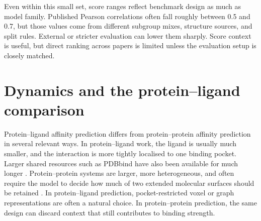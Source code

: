 \begin{table}[t]
\centering
\small
{}
\caption{Short score context for representative protein--protein affinity predictors.}
\label{tab:lit-comparison}
\end{table}

Even within this small set, score ranges reflect benchmark design as much as model family. Published Pearson correlations often fall roughly between 0.5 and 0.7, but those values come from different subgroup mixes, structure sources, and split rules. External or stricter evaluation can lower them sharply. Score context is useful, but direct ranking across papers is limited unless the evaluation setup is closely matched.

\section{Dynamics and the protein--ligand comparison}

Protein--ligand affinity prediction differs from protein--protein affinity prediction in several relevant ways. In protein--ligand work, the ligand is usually much smaller, and the interaction is more tightly localised to one binding pocket. Larger shared resources such as PDBbind have also been available for much longer \citep{Wang2004PDBbind}. Protein--protein systems are larger, more heterogeneous, and often require the model to decide how much of two extended molecular surfaces should be retained \citep{Guo2022PPBAReview,Siebenmorgen2020PPIReview}. In protein--ligand prediction, pocket-restricted voxel or graph representations are often a natural choice. In protein--protein prediction, the same design can discard context that still contributes to binding strength.

